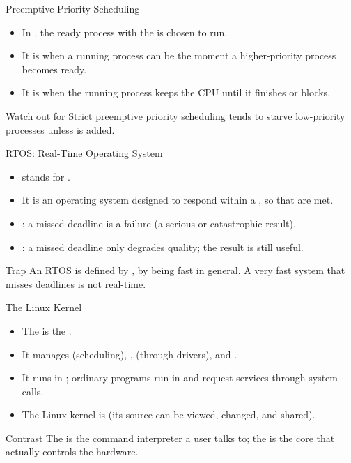 \documentclass[aspectratio=169]{beamer}
\begin{document}
\begin{frame}{Preemptive Priority Scheduling}
  \begin{itemize}
    \item In , the ready process with the
       is chosen to run.
    \item It is  when a running process can be
       the moment a higher-priority process becomes ready.
    \item It is  when the running process keeps the CPU
      until it finishes or blocks.
  \end{itemize}
  \begin{block}{Watch out for}
    Strict preemptive priority scheduling tends to starve low-priority
    processes unless  is added.
  \end{block}
\end{frame}

\begin{frame}{RTOS: Real-Time Operating System}
  \begin{itemize}
    \item {} stands for .
    \item It is an operating system designed to respond within a
      , so that  are met.
    \item {}: a missed deadline is a failure (a serious or
      catastrophic result).
    \item {}: a missed deadline only degrades quality; the
      result is still useful.
  \end{itemize}
  \begin{alertblock}{Trap}
    An RTOS is defined by ,  by being
    fast in general. A very fast system that misses deadlines is not
    real-time.
  \end{alertblock}
\end{frame}

\begin{frame}{The Linux Kernel}
  \begin{itemize}
    \item The  is the .
    \item It manages  (scheduling), ,
       (through drivers), and .
    \item It runs in ; ordinary programs run in
       and request services through system calls.
    \item The Linux kernel is  (its source can be viewed,
      changed, and shared).
  \end{itemize}
  \begin{block}{Contrast}
    The  is the command interpreter a user talks to; the
     is the core that actually controls the hardware.
  \end{block}
\end{frame}
\end{document}
